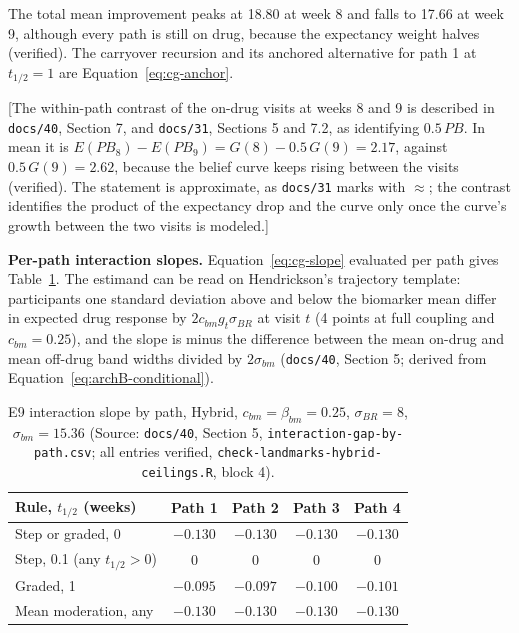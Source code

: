 \documentclass[11pt]{article}
\newcommand{\note}[1]{\textcolor{blue!60!black}{\small [#1]}}
\newcommand{\code}[1]{\texttt{#1}}
\begin{document}
\noindent The total mean improvement peaks at 18.80 at week 8 and
falls to 17.66 at week 9, although every path is still on drug,
because the expectancy weight halves (verified). The carryover
recursion and its anchored alternative for path 1 at $t_{1/2} = 1$
are Equation~\eqref{eq:cg-anchor}.

\note{The within-path contrast of the on-drug visits at weeks 8 and 9
is described in \code{docs/40}, Section 7, and \code{docs/31},
Sections 5 and 7.2, as identifying $0.5\,PB$. In mean it is
$E(PB_8) - E(PB_9) = G(8) - 0.5\,G(9) = 2.17$, against
$0.5\,G(9) = 2.62$, because the belief curve keeps rising between the
visits (verified). The statement is approximate, as \code{docs/31}
marks with $\approx$; the contrast identifies the product of the
expectancy drop and the curve only once the curve's growth between the
two visits is modeled.}

\textbf{Per-path interaction slopes.} Equation~\eqref{eq:cg-slope}
evaluated per path gives Table~\ref{tab:invc-slopes}. The estimand can
be read on Hendrickson's trajectory template: participants one standard
deviation above and below the biomarker mean differ in expected drug
response by $2 c_{bm} g_t \sigma_{BR}$ at visit $t$ (4 points at full
coupling and $c_{bm} = 0.25$), and the slope is minus the difference
between the mean on-drug and mean off-drug band widths divided by
$2\sigma_{bm}$ (\code{docs/40}, Section 5; derived from
Equation~\eqref{eq:archB-conditional}).

\begin{table}[h]
\centering\small
\caption{E9 interaction slope by path, Hybrid, $c_{bm} = \beta_{bm} =
0.25$, $\sigma_{BR} = 8$, $\sigma_{bm} = 15.36$ (Source:
\code{docs/40}, Section 5, \code{interaction-gap-by-path.csv}; all
entries verified, \code{check-landmarks-hybrid-ceilings.R}, block 4).}
\label{tab:invc-slopes}
\begin{tabular}{@{}lcccc@{}}
\toprule
Rule, $t_{1/2}$ (weeks) & Path 1 & Path 2 & Path 3 & Path 4 \\
\midrule
Step or graded, 0 & $-0.130$ & $-0.130$ & $-0.130$ & $-0.130$ \\
Step, 0.1 (any $t_{1/2} > 0$) & 0 & 0 & 0 & 0 \\
Graded, 1 & $-0.095$ & $-0.097$ & $-0.100$ & $-0.101$ \\
Mean moderation, any & $-0.130$ & $-0.130$ & $-0.130$ & $-0.130$ \\
\bottomrule
\end{tabular}
\end{table}
\end{document}
